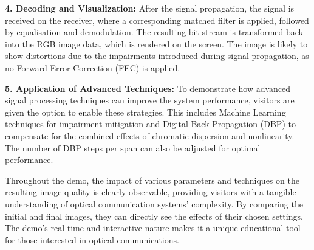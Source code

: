 \textbf{4. Decoding and Visualization:} After the signal propagation, the signal is received on the receiver, where a corresponding matched filter is applied, followed by equalisation and demodulation. The resulting bit stream is transformed back into the RGB image data, which is rendered on the screen. The image is likely to show distortions due to the impairments introduced during signal propagation, as no Forward Error Correction (FEC) is applied.

\textbf{5. Application of Advanced Techniques:} To demonstrate how advanced signal processing techniques can improve the system performance, visitors are given the option to enable these strategies. This includes Machine Learning techniques for impairment mitigation and Digital Back Propagation (DBP) to compensate for the combined effects of chromatic dispersion and nonlinearity. The number of DBP steps per span can also be adjusted for optimal performance.


Throughout the demo, the impact of various parameters and techniques on the resulting image quality is clearly observable, providing visitors with a tangible understanding of optical communication systems' complexity. By comparing the initial and final images, they can directly see the effects of their chosen settings. The demo's real-time and interactive nature makes it a unique educational tool for those interested in optical communications.










